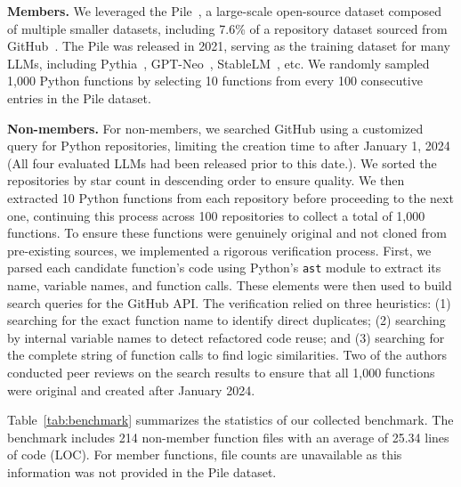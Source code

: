 \textbf{Members.} We leveraged the Pile~\cite{pile}, a large-scale open-source dataset composed of multiple smaller datasets, including 7.6\% of a repository dataset sourced from GitHub~\cite{thepile}. The Pile was released in 2021, serving as the training dataset for many LLMs, including Pythia~\cite{biderman2023pythia}, GPT-Neo~\cite{black2021gptneo}, StableLM~\cite{stabilityai2023stablelm}, etc. We randomly sampled 1,000 Python functions by selecting 10 functions from every 100 consecutive entries in the Pile dataset.


\textbf{Non-members.} For non-members, we searched GitHub using a customized query for Python repositories, limiting the creation time to after January 1, 2024 (All four evaluated LLMs had been released prior to this date.). We sorted the repositories by star count in descending order to ensure quality. We then extracted 10 Python functions from each repository before proceeding to the next one, continuing this process across 100 repositories to collect a total of 1,000 functions. To ensure these functions were genuinely original and not cloned from pre-existing sources, we implemented a rigorous verification process. First, we parsed each candidate function's code using Python's \texttt{ast} module to extract its name, variable names, and function calls. These elements were then used to build search queries for the GitHub API. The verification relied on three heuristics: (1) searching for the exact function name to identify direct duplicates; (2) searching by internal variable names to detect refactored code reuse; and (3) searching for the complete string of function calls to find logic similarities. Two of the authors conducted peer reviews on the search results to ensure that all 1,000 functions were original and created after January 2024.


Table~\ref{tab:benchmark} summarizes the statistics of our collected benchmark. The benchmark includes 214 non-member function files with an average of 25.34 lines of code (LOC). For member functions, file counts are unavailable as this information was not provided in the Pile dataset.

